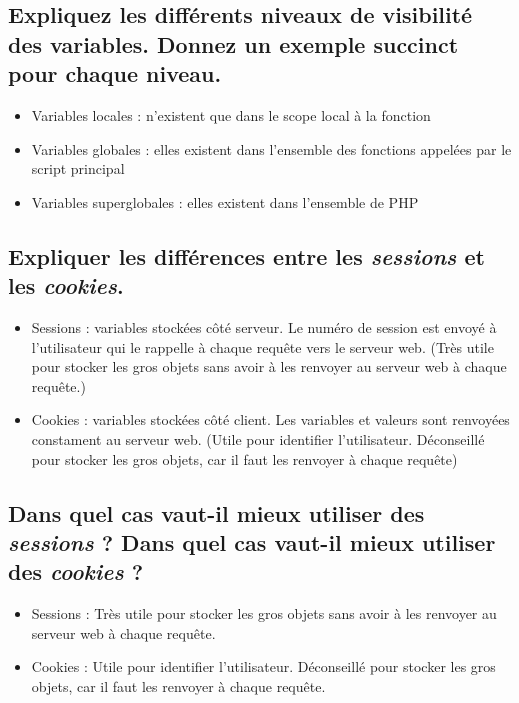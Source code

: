 \documentclass[11pt,a4paper]{article}
\begin{document}
\renewcommand\arraystretch{1}

\bigskip

\subsection{Expliquez les différents niveaux de visibilité des variables. Donnez un exemple succinct pour chaque niveau.}

\bigskip

\begin{itemize}
\item Variables locales : n'existent que dans le scope local à la fonction
\item Variables globales : elles existent dans l'ensemble des fonctions appelées par le script principal
\item Variables superglobales : elles existent dans l'ensemble de PHP
\end{itemize}

\bigskip

\subsection{Expliquer les différences entre les \textit{sessions} et les \textit{cookies}.}

\bigskip

\begin{itemize}
\item Sessions : variables stockées côté serveur. Le numéro de session est envoyé à l'utilisateur qui le rappelle à chaque requête vers le serveur web. (Très utile pour stocker les gros objets sans avoir à les renvoyer au serveur web à chaque requête.)
\item Cookies : variables stockées côté client. Les variables et valeurs sont renvoyées constament au serveur web. (Utile pour identifier l'utilisateur. Déconseillé pour stocker les gros objets, car il faut les renvoyer à chaque requête)
\end{itemize}

\bigskip

\subsection{Dans quel cas vaut-il mieux utiliser des \textit{sessions} ? Dans quel cas vaut-il mieux utiliser des \textit{cookies} ?}

\bigskip

\begin{itemize}
\item Sessions : Très utile pour stocker les gros objets sans avoir à les renvoyer au serveur web à chaque requête.
\item Cookies : Utile pour identifier l'utilisateur. Déconseillé pour stocker les gros objets, car il faut les renvoyer à chaque requête.
\end{itemize}
\end{document}
